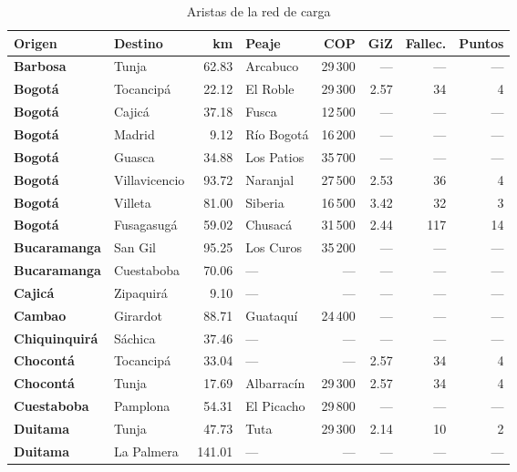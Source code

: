 \renewcommand{\arraystretch}{1.2}
\begin{longtable}{|l|l|r|l|r|r|r|r|}
\caption{Aristas de la red de carga}\label{tab:aristas}\\
\hline
\rowcolor{gray!20} \textbf{Origen} & \textbf{Destino} & \textbf{km} & \textbf{Peaje} & \textbf{COP} & \textbf{GiZ} & \textbf{Fallec.} & \textbf{Puntos} \\
\hline
\endhead
\textbf{Barbosa} & Tunja & 62.83 & Arcabuco & 29\,300 & --- & --- & --- \\
\hline
\textbf{Bogotá} & Tocancipá & 22.12 & El Roble & 29\,300 & 2.57 & 34 & 4 \\
\hline
\textbf{Bogotá} & Cajicá & 37.18 & Fusca & 12\,500 & --- & --- & --- \\
\hline
\textbf{Bogotá} & Madrid & 9.12 & Río Bogotá & 16\,200 & --- & --- & --- \\
\hline
\textbf{Bogotá} & Guasca & 34.88 & Los Patios & 35\,700 & --- & --- & --- \\
\hline
\textbf{Bogotá} & Villavicencio & 93.72 & Naranjal & 27\,500 & 2.53 & 36 & 4 \\
\hline
\textbf{Bogotá} & Villeta & 81.00 & Siberia & 16\,500 & 3.42 & 32 & 3 \\
\hline
\textbf{Bogotá} & Fusagasugá & 59.02 & Chusacá & 31\,500 & 2.44 & 117 & 14 \\
\hline
\textbf{Bucaramanga} & San Gil & 95.25 & Los Curos & 35\,200 & --- & --- & --- \\
\hline
\textbf{Bucaramanga} & Cuestaboba & 70.06 & --- & --- & --- & --- & --- \\
\hline
\textbf{Cajicá} & Zipaquirá & 9.10 & --- & --- & --- & --- & --- \\
\hline
\textbf{Cambao} & Girardot & 88.71 & Guataquí & 24\,400 & --- & --- & --- \\
\hline
\textbf{Chiquinquirá} & Sáchica & 37.46 & --- & --- & --- & --- & --- \\
\hline
\textbf{Chocontá} & Tocancipá & 33.04 & --- & --- & 2.57 & 34 & 4 \\
\hline
\textbf{Chocontá} & Tunja & 17.69 & Albarracín & 29\,300 & 2.57 & 34 & 4 \\
\hline
\textbf{Cuestaboba} & Pamplona & 54.31 & El Picacho & 29\,800 & --- & --- & --- \\
\hline
\textbf{Duitama} & Tunja & 47.73 & Tuta & 29\,300 & 2.14 & 10 & 2 \\
\hline
\textbf{Duitama} & La Palmera & 141.01 & --- & --- & --- & --- & --- \\

\end{longtable}
